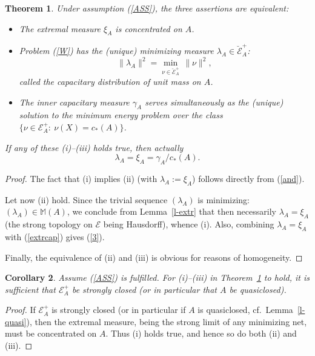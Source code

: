 \documentclass[12pt,a4paper,reqno]{amsart} %
\theoremstyle{lause}
\theoremstyle{maaritelma}
\theoremstyle{lause}
\newtheorem{theorem}{Theorem}[section]
\newtheorem{corollary}[theorem]{Corollary}
\theoremstyle{maaritelma}
\numberwithin{equation}{section}
\begin{document}
\begin{theorem}\label{cor1}Under assumption\/ {\rm(\ref{ASS})}, the three assertions are equivalent:
\begin{itemize}\item[{\rm(i)}] The extremal measure\/ $\xi_A$ is concentrated on\/ $A$.
\item[{\rm(ii)}]Problem\/ {\rm(\ref{W})} has the\/ {\rm(}unique\/{\rm)} minimizing measure\/ $\lambda_A\in\breve{\mathcal E}^+_A$:
\[\|\lambda_A\|^2=\min_{\nu\in\breve{\mathcal E}^+_A}\,\|\nu\|^2,\]
called the capacitary distribution of unit mass on\/ $A$.
\item[{\rm(iii)}] The inner capacitary measure\/ $\gamma_A$ serves simultaneously as the\/ {\rm(}unique\/{\rm)} solution to the minimum energy problem over the class\/ $\bigl\{\nu\in\mathcal E^+_A: \ \nu(X)=c_*(A)\bigr\}$.
\end{itemize}
If any of these\/ {\rm(i)}--{\rm(iii)} holds true, then actually
\begin{equation}\label{3}\lambda_A=\xi_A=\gamma_A/c_*(A).
\end{equation}
\end{theorem}

\begin{proof} The fact that (i) implies (ii) (with $\lambda_A:=\xi_A$)
follows directly from (\ref{and}).

Let now (ii) hold. Since the trivial sequence $(\lambda_A)$ is minimizing:
$(\lambda_A)\in\mathbb M(A)$,
we conclude from Lemma~\ref{l-extr} that then necessarily $\lambda_A=\xi_A$ (the strong topology on $\mathcal E$ being Hausdorff), whence (i). Also, combining $\lambda_A=\xi_A$ with (\ref{extrcap}) gives (\ref{3}).

Finally, the equivalence of (ii) and (iii) is obvious
for reasons of homogeneity.
\end{proof}

\begin{corollary}\label{cor1qu}Assume\/ {\rm(\ref{ASS})} is fulfilled. For\/ {\rm(i)}--{\rm(iii)} in Theorem\/~{\rm\ref{cor1}} to hold, it is sufficient that\/ $\mathcal E^+_A$ be strongly closed\/ {\rm(}or in particular that\/ $A$ be quasiclosed\/{\rm)}.\end{corollary}

\begin{proof} If $\mathcal E^+_A$ is strongly closed (or in particular if $A$ is quasiclosed, cf.\ Lemma~\ref{l-quasi}), then the extremal measure, being the strong limit of any minimizing net, must be concentrated on $A$. Thus (i) holds true, and hence so do both (ii) and (iii).
\end{proof}
\end{document}
